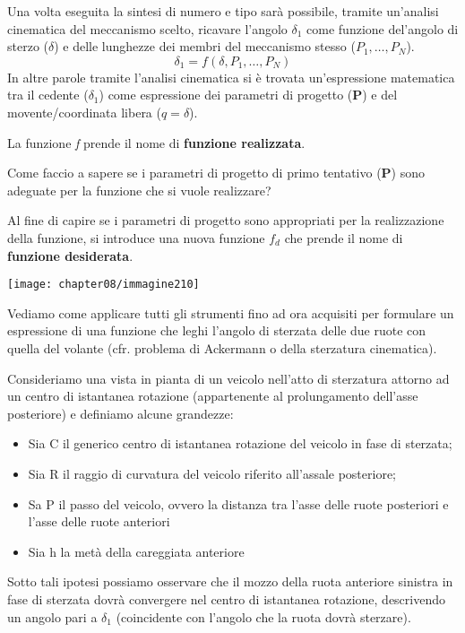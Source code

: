 Una volta eseguita la sintesi di numero e tipo sarà possibile, tramite un'analisi cinematica del meccanismo scelto, ricavare l'angolo $\delta_1$ come funzione del'angolo di sterzo ($\delta$) e delle lunghezze dei membri del meccanismo stesso ($P_1, \dots , P_N$).
\[\delta_1 = f(\delta, P_1, \dots, P_N)\]
In altre parole tramite l'analisi cinematica si è trovata un'espressione matematica tra il cedente ($\delta_1$) come espressione dei parametri di progetto (\textbf{P}) e del movente/coordinata libera ($q = \delta$).

La funzione \emph{f} prende il nome di \textbf{funzione realizzata}.

Come faccio a sapere se i parametri di progetto di primo tentativo (\textbf{P}) sono adeguate per la funzione che si vuole realizzare?

Al fine di capire se i parametri di progetto sono appropriati per la realizzazione della funzione, si introduce una nuova funzione $f_d$ che prende il nome di \textbf{funzione desiderata}.

\begin{center}
\texttt{[image: chapter08/immagine210]}
\end{center}
Vediamo come applicare tutti gli strumenti fino ad ora acquisiti per formulare un espressione di una funzione che leghi l'angolo di sterzata delle due ruote con quella del volante (cfr. problema di Ackermann o della sterzatura cinematica).

Consideriamo una vista in pianta di un veicolo nell'atto di sterzatura attorno ad un centro di istantanea rotazione (appartenente al prolungamento dell'asse posteriore) e definiamo alcune grandezze:
\begin{itemize}
\item Sia C il generico centro di istantanea rotazione del veicolo in fase di sterzata;
\item Sia R il raggio di curvatura del veicolo riferito all'assale posteriore;
\item Sa P il passo del veicolo, ovvero la distanza tra l'asse delle ruote posteriori e l'asse delle ruote anteriori
\item Sia h la metà della careggiata anteriore
\end{itemize}
Sotto tali ipotesi possiamo osservare che il mozzo della ruota anteriore sinistra in fase di sterzata dovrà convergere nel centro di istantanea rotazione, descrivendo un angolo pari a $\delta_1$ (coincidente con l'angolo che la ruota dovrà sterzare).

